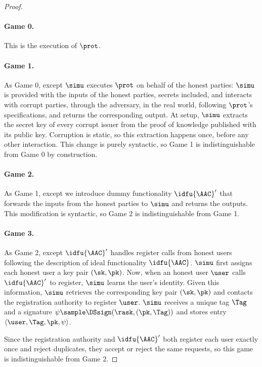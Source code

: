\begin{proof}

  \paragraph{Game 0.} This is the execution of $\prot$.

  \paragraph{Game 1.} As Game 0, except $\simu$ executes $\prot$ on
behalf of the honest parties: $\simu$ is provided with the inputs of the
honest parties, secrets included, and interacts with corrupt parties, through the
adversary, in the real world, following $\prot$'s specifications, and returns the
corresponding output. At setup, $\simu$ extracts the secret key of every corrupt
issuer from the proof of knowledge published with its public key. Corruption is
static, so this extraction happens once, before any other interaction. This
change is purely syntactic, so Game 1 is indistinguishable from Game 0 by
construction.

  \paragraph{Game 2.} As Game 1, except we introduce dummy functionality
$\idfu{\AAC}'$ that forwards the inputs from the honest parties to $\simu$ and
returns the outputs. This modification is syntactic, so Game 2 is
indistinguishable from Game 1.

  \paragraph{Game 3.} As Game 2, except $\idfu{\AAC}'$ handles register calls
from honest users following the description of ideal functionality
$\idfu{\AAC}$. $\simu$ first assigns each honest user a key pair $(\sk, \pk)$.
Now, when an honest user $\user$ calls $\idfu{\AAC}'$ to register, $\simu$
learns the user's identity. Given this information, $\simu$ retrieves the
corresponding key pair $(\sk,\pk)$ and contacts the registration authority to
register $\user$. $\simu$ receives a unique tag $\Tag$ and a signature $\psi
\sample \DSsign(\rask, (\pk, \Tag))$ and stores entry $\langle \user, \Tag,
\pk, \psi\rangle $.

  Since the registration authority and $\idfu{\AAC}'$ both register each user
exactly once and reject duplicates, they accept or reject the same requests, so
this game is indistinguishable from Game 2.


\end{proof}
